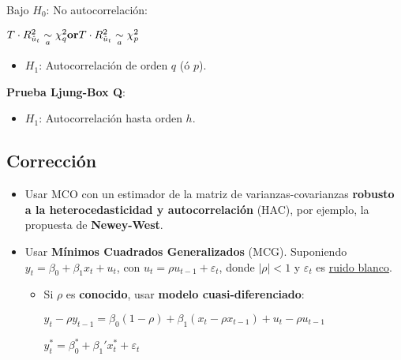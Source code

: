 \documentclass[10pt, a4paper, landscape]{article}
\begin{document}
\begin{multicols}{3}
\begin{itemize}[leftmargin=*]
			Bajo $H_{0}$: No autocorrelación:
			
			\begin{center}
				$\hfill T \cdot R^{2}_{\hat{u}_t}\underset{a}{\sim}\chi^{2}_{q} \hfill \textbf{or} \hfill T \cdot R^{2}_{\hat{u}_t}\underset{a}{\sim}\chi^{2}_{p} \hfill$
			\end{center}
			
			\begin{itemize}[leftmargin=*]
				\item $H_{1}$: Autocorrelación de orden $q$ (ó $p$).
			\end{itemize}
			
			\textbf{Prueba Ljung-Box Q}:
			
			\begin{itemize}[leftmargin=*]
				\item $H_{1}$: Autocorrelación hasta orden $h$.
			\end{itemize}
			
		\end{itemize}
		
		\columnbreak
		
		\subsection*{Corrección}
		
		\begin{itemize}[leftmargin=*]
			\item Usar MCO con un estimador de la matriz de varianzas-covarianzas \textbf{robusto a la heterocedasticidad y autocorrelación} (HAC), por ejemplo, la propuesta de \textbf{Newey-West}.
			\item Usar \textbf{Mínimos Cuadrados Generalizados} (MCG). Suponiendo $y_{t} = \beta_{0} + \beta_{1} x_{t} + u_{t}$, con $u_{t} = \rho u_{t - 1}+ \varepsilon_{t}$, donde $\lvert \rho \rvert < 1$ y $\varepsilon_{t}$ es \underline{ruido blanco}.
			
			\begin{itemize}[leftmargin=*]
				\item Si $\rho$ es \textbf{conocido}, usar \textbf{modelo cuasi-diferenciado}:
			
				\begin{center}
					$y_{t} - \rho y_{t - 1}= \beta_{0} (1 - \rho) + \beta_{1} (x_{t} - \rho x_{t - 1}) + u_{t} - \rho u_{t - 1}$
					
					$y_{t}^{*} = \beta_{0}^{*} + \beta_{1}' x_{t}^{*} + \varepsilon_{t}$
				\end{center}
				

\end{itemize}
\end{itemize}
\end{multicols}
\end{document}
